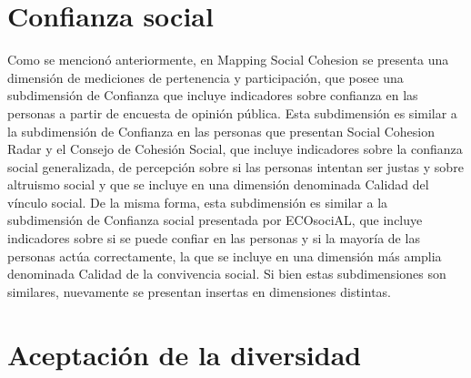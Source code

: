 \documentclass[
  12pt,
]{book}
\begin{document}
\hypertarget{confianza-social}{%
\section{Confianza social}\label{confianza-social}}

Como se mencionó anteriormente, en Mapping Social Cohesion se presenta una dimensión de mediciones de pertenencia y participación, que posee una subdimensión de Confianza que incluye indicadores sobre confianza en las personas a partir de encuesta de opinión pública. Esta subdimensión es similar a la subdimensión de Confianza en las personas que presentan Social Cohesion Radar y el Consejo de Cohesión Social, que incluye indicadores sobre la confianza social generalizada, de percepción sobre si las personas intentan ser justas y sobre altruismo social y que se incluye en una dimensión denominada Calidad del vínculo social. De la misma forma, esta subdimensión es similar a la subdimensión de Confianza social presentada por ECOsociAL, que incluye indicadores sobre si se puede confiar en las personas y si la mayoría de las personas actúa correctamente, la que se incluye en una dimensión más amplia denominada Calidad de la convivencia social. Si bien estas subdimensiones son similares, nuevamente se presentan insertas en dimensiones distintas.

\hypertarget{aceptaciuxf3n-de-la-diversidad}{%
\section{Aceptación de la diversidad}\label{aceptaciuxf3n-de-la-diversidad}}
\end{document}
